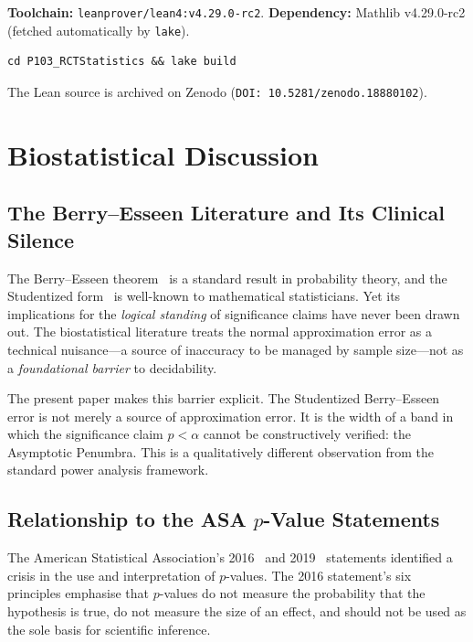 \documentclass[11pt,a4paper]{article}
\theoremstyle{plain}
\theoremstyle{definition}
\begin{document}
\textbf{Toolchain:} \texttt{leanprover/lean4:v4.29.0-rc2}. \textbf{Dependency:} Mathlib v4.29.0-rc2 (fetched automatically by \texttt{lake}).

\begin{verbatim}
cd P103_RCTStatistics && lake build
\end{verbatim}

\noindent The Lean source is archived on Zenodo (\texttt{DOI: 10.5281/zenodo.18880102}).

\section{Biostatistical Discussion}\label{sec:biostat}

\subsection{The Berry--Esseen Literature and Its Clinical Silence}

The Berry--Esseen theorem~\cite{berry1941,esseen1942} is a standard result in probability theory, and the Studentized form~\cite{bentkus2003,shao1999} is well-known to mathematical statisticians.  Yet its implications for the \emph{logical standing} of significance claims have never been drawn out.  The biostatistical literature treats the normal approximation error as a technical nuisance---a source of inaccuracy to be managed by sample size---not as a \emph{foundational barrier} to decidability.

The present paper makes this barrier explicit.  The Studentized Berry--Esseen error is not merely a source of approximation error.  It is the width of a band in which the significance claim $p < \alpha$ cannot be constructively verified: the Asymptotic Penumbra.  This is a qualitatively different observation from the standard power analysis framework.

\subsection{Relationship to the ASA $p$-Value Statements}

The American Statistical Association's 2016~\cite{wasserstein2016} and 2019~\cite{wasserstein2019} statements identified a crisis in the use and interpretation of $p$-values.  The 2016 statement's six principles emphasise that $p$-values do not measure the probability that the hypothesis is true, do not measure the size of an effect, and should not be used as the sole basis for scientific inference.
\end{document}
